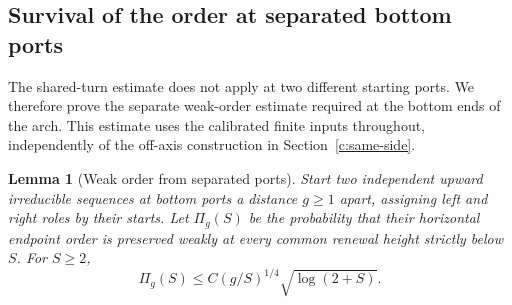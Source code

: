 \documentclass[11pt]{article}
\numberwithin{equation}{section}
\newtheorem{lemma}[theorem]{Lemma}
\theoremstyle{definition}\newtheorem{definition}[theorem]{Definition}
\theoremstyle{remark}\newtheorem{remark}[theorem]{Remark}
\begin{document}
\subsection{Survival of the order at separated bottom ports}
The shared-turn estimate does not apply at two different starting ports.
We therefore prove the separate weak-order estimate required at the
bottom ends of the arch. This estimate uses the calibrated finite inputs
throughout, independently of the off-axis construction in
Section~\ref{c:same-side}.

\begin{lemma}[Weak order from separated ports]\label{c:bottom-survival}
Start two independent upward irreducible sequences at bottom ports a
distance $g\ge1$ apart, assigning left and right roles by their starts.
Let $\Pi_g(S)$ be the probability that their horizontal endpoint order
is preserved weakly at every common renewal height strictly below $S$.
For $S\ge2$,
\[
 \Pi_g(S)\le C(g/S)^{1/4}\sqrt{\log(2+S)}.
\]
\end{lemma}
\end{document}
